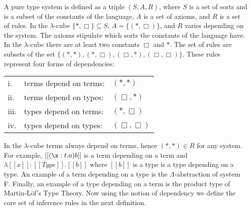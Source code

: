 A pure type system is defined as a triple $(S, A, R)$, where $S$ is a
set of sorts and is a subset of the constants of the language, $A$
is a set of axioms, and $R$ is a set of rules.  In the $\lambda$-cube
$\{*, \Box\} \subseteq S$, $A = \{(*, \Box)\}$, and $R$ varies depending on
the system. The axioms stipulate which sorts the constants of the
language have.  In the $\lambda$-cube there are at least two constants
$\Box$ and $*$.  The set of rules are subsets of the set 
$\{(*,*),(*,\Box),(\Box,*),(\Box,\Box)\}$. These rules represent four forms of dependencies:
\begin{center}
  \begin{tabular}{lll}
    i.   & terms depend on terms: & $(*,*)$\\
    ii.  & terms depend on types: & $(\Box,*)$\\
    iii. & types depend on terms: & $(*,\Box)$\\
    iv.  & types depend on types: & $(\Box,\Box)$
  \end{tabular}  
\end{center}
In the $\lambda$-cube terms always depend on terms, hence $(*,*) \in R$ 
for any system.  For example, $[[(\x:t.a) b]]$ is a term depending
on a term and $\lambda [[x]]:[[Type]].[[b]]$ where $[[b]]$ is a type
is a type depending on a type.  An example of a term depending on a
type is the $\Lambda$-abstraction of system F.  Finally, an example of
a type depending on a term is the product type of Martin-L\"of's Type
Theory.  Now using the notion of dependency we define the core set of
inference rules in the next definition.
